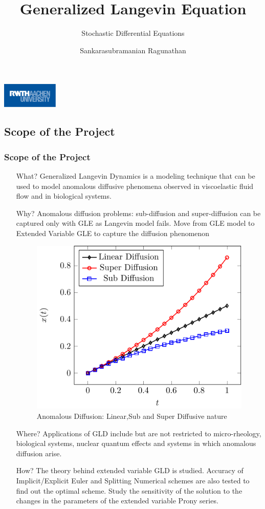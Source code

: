 \documentclass[a4paper,10pt]{beamer}
\title{Generalized Langevin Equation}
\subtitle{Stochastic Differential Equations}
\author{Sankarasubramanian Ragunathan \newline \newline 389851}
\institute{\textbf{RWTH Aachen}}
\date{}
\begin{document}
	\begin{frame}
		\titlepage
		\centering
		\includegraphics[width=0.2\textwidth]{RWTH_Aachen_University_Logo.eps}
	\end{frame}

	\begin{frame}
		\tableofcontents
	\end{frame}

	\begin{frame}
		\section{Scope of the Project}
		\frametitle{Scope of the Project}
		
		\begin{itemize}
			\item[What?]{Generalized Langevin Dynamics is a modeling technique that can be used to model anomalous diffusive phenomena observed in viscoelastic fluid flow and in biological systems.}
			
			\item[Why?]{Anomalous diffusion problems: sub-diffusion and super-diffusion can be captured only with GLE as Langevin model fails. Move from GLE model to Extended Variable GLE to capture the diffusion phenomenon}
			
			\begin{figure}[H]
				\includegraphics[width=0.33\linewidth]{./Plots/Diffusion.pdf}
				\caption{Anomalous Diffusion: Linear,Sub and Super Diffusive nature}
			\end{figure}
		\end{itemize}
	\end{frame}

	\begin{frame}
	\begin{itemize}
		\item[Where?]{Applications of GLD include but are not restricted to micro-rheology, biological systems, nuclear quantum effects and systems in which anomalous diffusion arise.}
		
		\item[How?]{The theory behind extended variable GLD is studied. Accuracy of Implicit/Explicit Euler and Splitting Numerical schemes are also tested to find out the optimal scheme. Study the sensitivity of the solution to the changes in the parameters of the extended variable Prony series.}
	\end{itemize}
	\end{frame}
\end{document}
